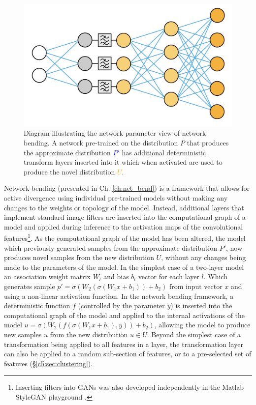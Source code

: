 \begin{figure}[!htbp]
    \centering
    \includegraphics[width=1\textwidth]{figures/c6_active_div/diagrams/network_bending.png}
    \caption[Diagram illustrating the network parameter view of network bending.]{Diagram illustrating the network parameter view of network bending. A network pre-trained on the distribution $P$ that produces the approximate distribution \textcolor{blue}{$P'$} has additional deterministic transform layers inserted into it which when activated are used to produce the novel distribution \textcolor{orange}{$U$}.}
  \label{fig:c6:network-bending}
  \end{figure}

Network bending \citep{broad2021network,broad2022network} (presented in Ch. \ref{ch:net_bend}) is a framework that allows for active divergence using individual pre-trained models without making any changes to the weights or topology of the model. 
Instead, additional layers that implement standard image filters are inserted into the computational graph of a model and applied during inference to the activation maps of the convolutional features\footnote{
    Inserting filters into GANs was also developed independently in the Matlab StyleGAN playground \citep{pinkney2020matlab}.}. 
As the computational graph of the model has been altered, the model which previously generated samples from the approximate distribution $P'$, now produces novel samples from the new distribution $U$, without any changes being made to the parameters of the model. 
In the simplest case of a two-layer model an association weight matrix $W_l$ and bias $b_l$ vector for each layer $l$. 
Which generates sample $p'=\sigma(W_2(\sigma(W_1x+b_1))+b_2)$ from input vector $x$ and using a non-linear activation function. 
In the network bending framework, a deterministic function $f$ (controlled by the parameter $y$) is inserted into the computational graph of the model and applied to the internal activations of the model $u=\sigma(W_2(f(\sigma(W_1x+b_1),y))+b_2)$, allowing the model to produce new samples $u$ from the new distribution $u \in U$. Beyond the simplest case of a transformation being applied to all features in a layer, the transformation layer can also be applied to a random sub-section of features, or to a pre-selected set of features (\S \ref{c5:sec:clustering}). 

